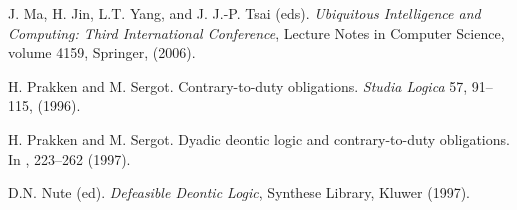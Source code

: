 \documentclass{pseudoelsart}
\begin{document}
\begin{thebibliography}{99}
J. Ma, H. Jin, L.T. Yang, and J. J.-P. Tsai (eds).
\emph{Ubiquitous Intelligence and Computing: Third International Conference}, 
Lecture Notes in Computer Science, volume 4159, Springer, (2006).

H. Prakken and M. Sergot.
\newblock Contrary-to-duty obligations.
\newblock \emph{Studia Logica} 57, 91--115, (1996).

H. Prakken and M. Sergot.
\newblock Dyadic deontic logic and contrary-to-duty obligations.
\newblock In \cite{N97}, 223--262 (1997).

D.N. Nute (ed).
\newblock \emph{Defeasible Deontic Logic}, Synthese Library, Kluwer (1997).


\end{thebibliography}


 
\end{document}
